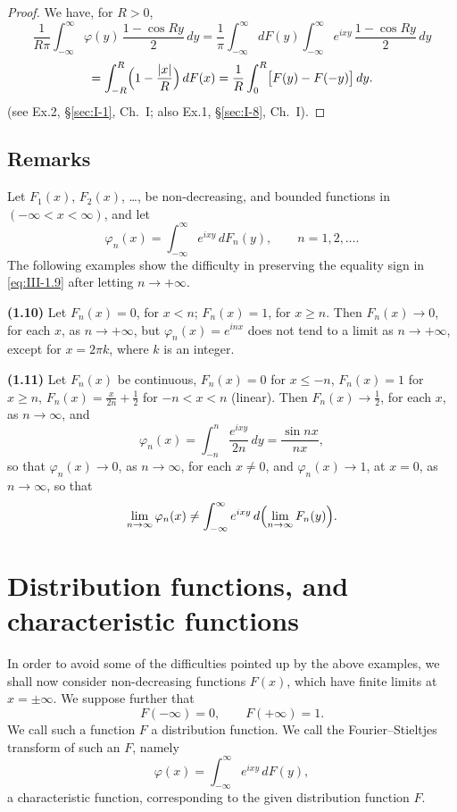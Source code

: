 \begin{proof}
We have, for $R>0$,
\[
\frac{1}{R\pi}\int_{-\infty}^{\infty}\varphi(y)\,\frac{1-\cos Ry}{2}\,dy
=\frac{1}{\pi}\int_{-\infty}^{\infty}dF(y)\int_{-\infty}^{\infty}e^{ixy}\,\frac{1-\cos Ry}{2}\,dy
\]
\[
=\int_{-R}^{R}\Bigl(1-\frac{|x|}{R}\Bigr)\,dF(x)
=\frac{1}{R}\int_{0}^{R}\bigl[F(y)-F(-y)\bigr]\,dy.
\]
(see Ex.2, \S\ref{sec:I-1}, Ch.~I; also Ex.1, \S\ref{sec:I-8}, Ch.~I).
\end{proof}

\subsection*{Remarks}

Let $F_{1}(x)$, $F_{2}(x)$, \dots, be non-decreasing, and bounded functions in $(-\infty<x<\infty)$, and let
\begin{equation}\tag{1.9}\label{eq:III-1.9}
\varphi_{n}(x)=\int_{-\infty}^{\infty}e^{ixy}\,dF_{n}(y),\qquad n=1,2,\dots.
\end{equation}
The following examples show the difficulty in preserving the equality sign in \eqref{eq:III-1.9} after letting $n\to+\infty$.

\noindent\textbf{(1.10)} Let $F_{n}(x)=0$, for $x<n$; $F_{n}(x)=1$, for $x\ge n$. Then $F_{n}(x)\to0$, for each $x$, as $n\to+\infty$, but $\varphi_{n}(x)=e^{inx}$ does not tend to a limit as $n\to+\infty$, except for $x=2\pi k$, where $k$ is an integer.

\noindent\textbf{(1.11)} Let $F_{n}(x)$ be continuous, $F_{n}(x)=0$ for $x\le-n$, $F_{n}(x)=1$ for $x\ge n$, $F_{n}(x)=\frac{x}{2n}+\frac12$ for $-n<x<n$ (linear). Then $F_{n}(x)\to\frac12$, for each $x$, as $n\to\infty$, and
\[
\varphi_{n}(x)=\int_{-n}^{n}\frac{e^{ixy}}{2n}\,dy=\frac{\sin nx}{nx},
\]
so that $\varphi_{n}(x)\to0$, as $n\to\infty$, for each $x\neq0$, and $\varphi_{n}(x)\to1$, at $x=0$, as $n\to\infty$, so that
\[
\lim_{n\to\infty}\varphi_{n}(x)\neq\int_{-\infty}^{\infty}e^{ixy}\,d\Bigl(\lim_{n\to\infty}F_{n}(y)\Bigr).
\]

\section{Distribution functions, and characteristic functions}
\label{sec:III-2}

In order to avoid some of the difficulties pointed up by the above examples, we shall now consider non-decreasing functions $F(x)$, which have finite limits at $x=\pm\infty$. We suppose further that
\begin{equation}\tag{2.1}\label{eq:III-2.1}
F(-\infty)=0,\qquad F(+\infty)=1.
\end{equation}
We call such a function $F$ a distribution function. We call the Fourier--Stieltjes transform of such an $F$, namely
\[
\varphi(x)=\int_{-\infty}^{\infty}e^{ixy}\,dF(y),
\]
a characteristic function, corresponding to the given distribution function $F$.

